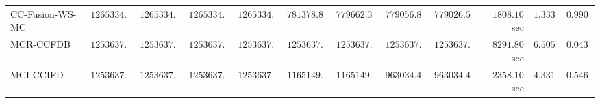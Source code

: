 \begin{table}[H]
\begin{tabular}{lrrrrrrrrrrr}
     CC-Fusion-WS-MC & $   1265334.24$ & $   1265334.24$ & $   1265334.24$ & $   1265334.24$ & $    781378.89$ & $    779662.36$ & $    779056.84$ & $    779026.51$ & $      1808.10$ sec    & $       1.3334$  & $       0.9906$ \\ 
\cmidrule{1-1} 
           MCR-CCFDB & $   1253637.12$ & $   1253637.12$ & $   1253637.12$ & $   1253637.12$ & $   1253637.12$ & $   1253637.12$ & $   1253637.12$ & $   1253637.12$ & $      8291.80$ sec    & $       6.5058$  & $       0.0432$ \\ 
\cmidrule{1-1} 
           MCI-CCIFD & $   1253637.12$ & $   1253637.12$ & $   1253637.12$ & $   1253637.12$ & $   1165149.49$ & $   1165149.49$ & $    963034.43$ & $    963034.43$ & $      2358.10$ sec    & $       4.3319$  & $       0.5461$ \\ 
\bottomrule
\end{tabular}
\end{table}


